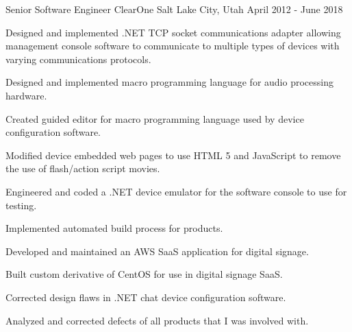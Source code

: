 \begin{cventries}
\cventry
{Senior Software Engineer} %
{ClearOne} %
{Salt Lake City, Utah} %
{April 2012 - June 2018} %
{
  \begin{cvitems} %
    \item {Designed and implemented .NET TCP socket communications adapter allowing management console software to communicate to multiple types of devices with varying communications protocols.}
    \item {Designed and implemented macro programming language for audio processing hardware.}
    \item {Created guided editor for macro programming language used by device configuration software.}
    \item {Modified device embedded web pages to use HTML 5 and JavaScript to remove the use of flash/action script movies.}
    \item {Engineered and coded a .NET \Csh device emulator for the software console to use for testing.}
    \item {Implemented automated build process for products.}
    \item {Developed and maintained an AWS SaaS application for digital signage.}
    \item {Built custom derivative of CentOS for use in digital signage SaaS.}
    \item {Corrected design flaws in .NET chat device configuration software.}
    \item {Analyzed and corrected defects of all products that I was involved with.}
  \end{cvitems}
}

\end{cventries}
